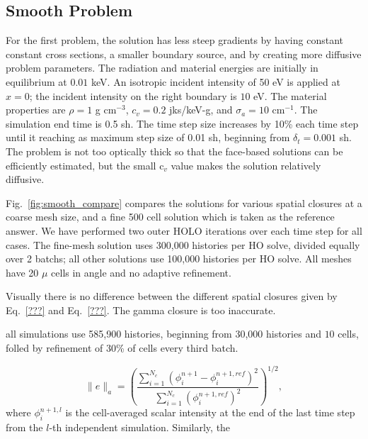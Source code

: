 \subsection{Smooth Problem}

For the first problem, the solution has less steep gradients by having constant constant cross
sections, a smaller boundary source, and by creating more diffusive problem parameters.
The radiation and material energies are initially in
equilibrium at $0.01$ keV.   An isotropic incident intensity of 50 eV is applied
at $x=0$; the incident intensity on the right boundary is $10$ eV.
The material properties are $\rho = 1$ g cm$^{-3}$, $c_v = 0.2$ jks/keV-g, and
$\sigma_a=10$ cm$^{-1}$.
The simulation end time is 0.5 sh.  The time step size increases by 10\% each time step
until it reaching as maximum step size of 0.01 sh, beginning from $\delta_t = 0.001$ sh.
The problem is not too optically thick so that the face-based solutions can be efficiently
estimated, but the small c$_v$ value makes the solution relatively diffusive.  

Fig.~\ref{fig:smooth_compare} compares the solutions for various spatial closures at a
coarse mesh size, and a fine 500 cell solution which is taken as the reference answer. We
have performed two outer HOLO iterations over each time step for all cases.   The
fine-mesh solution uses 300,000 histories per HO solve, divided equally over 2 batchs; all
other solutions use 100,000 histories per HO solve.  All meshes have 20 $\mu$
cells in angle and no adaptive refinement.

Visually there
is no difference between the different spatial closures given by Eq.~\eqref{???} and Eq.~\eqref{???}. The
gamma closure is too inaccurate.

all simulations use 585,900 histories, beginning from 30,000 histories and $10$ \mu cells,
folled by refinement of 30\%
of cells every third batch. 

\begin{equation}
    \|e\|_a = \left({\frac{\sum\limits_{i=1}^{N_c}
    \left(\phi_i^{n+1} - \phi_i^{n+1,ref}
\right)^2}{\sum\limits_{i=1}^{N_c}\left(\phi_i^{n+1,ref}\right)^2}}\right)^{1/2},
\end{equation}
where $\phi_i^{n+1,l}$ is the cell-averaged scalar intensity at the end of the last time
step from the $l$-th independent simulation.  Similarly, the 





